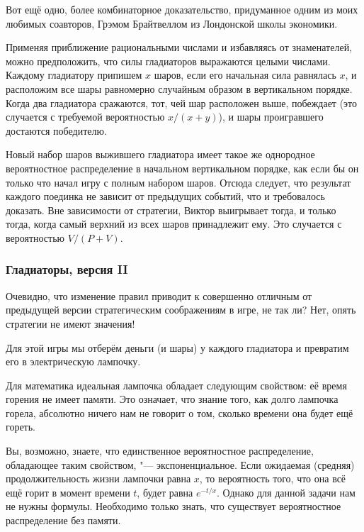 \documentclass[twoside]{book}
\begin{document}
Вот ещё одно, более комбинаторное доказательство, придуманное одним из моих любимых соавторов, Грэмом Брайтвеллом из Лондонской школы экономики. %

Применяя приближение рациональными числами и избавляясь от знаменателей, можно предположить, что силы гладиаторов выражаются целыми числами.
Каждому гладиатору припишем $x$ шаров, если его начальная сила равнялась $x$, и расположим все шары равномерно случайным образом в вертикальном порядке.
Когда два гладиатора сражаются, тот, чей шар расположен выше, побеждает (это случается с требуемой вероятностью $x/(x+y)$), и шары проигравшего достаются победителю.

Новый набор шаров выжившего гладиатора имеет такое же однородное вероятностное распределение в начальном вертикальном порядке, как если бы он только что начал игру с полным набором шаров.
Отсюда следует, что результат каждого поединка не зависит от предыдущих событий, что и требовалось доказать.
Вне зависимости от стратегии, Виктор выигрывает тогда, и только тогда, когда самый верхний из всех шаров принадлежит ему.
Это случается с вероятностью $V/(P+V)$.

\subsubsection*{Гладиаторы, версия II}%

Очевидно, что изменение правил приводит к совершенно отличным от предыдущей версии стратегическим соображениям в игре, не так ли? Нет, опять стратегии не имеют значения!

\medskip

Для этой игры мы отберём деньги (и шары) у каждого гладиатора и превратим его
в электрическую лампочку.

Для математика идеальная лампочка обладает следующим свойством: её время горения не имеет памяти.
Это означает, что знание того, как долго лампочка горела, абсолютно ничего нам не говорит о том, сколько времени она будет ещё гореть.

Вы, возможно, знаете, что единственное вероятностное распределение, обладающее таким свойством, "--- экспоненциальное.
Если ожидаемая (средняя) продолжительность жизни лампочки равна $x$, то вероятность того, что она всё ещё горит в момент времени $t$, будет равна $e^{-t/x}$.
Однако для данной задачи нам не нужны формулы.
Необходимо только знать, что существует вероятностное распределение без памяти.
\end{document}
